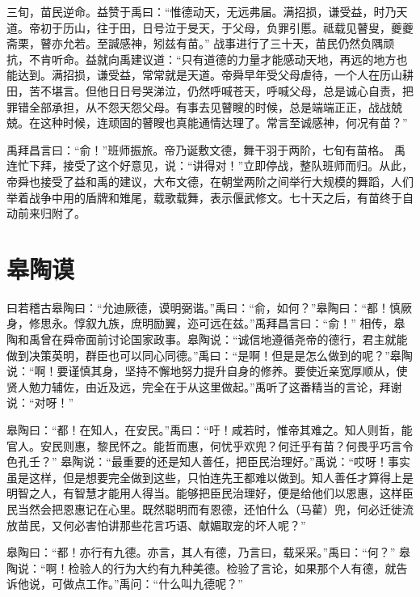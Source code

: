 \documentclass[a4paper,12pt,UTF8,twoside]{ctexbook}
\begin{document}
三旬，苗民逆命。益赞于禹曰：“惟德动天，无远弗届。满招损，谦受益，时乃天道。帝初于历山，往于田，日号泣于旻天，于父母，负罪引慝。祗载见瞽叟，夔夔斋栗，瞽亦允若。至諴感神，矧兹有苗。”
战事进行了三十天，苗民仍然负隅顽抗，不肯听命。益就向禹建议道：“只有道德的力量才能感动天地，再远的地方也能达到。满招损，谦受益，常常就是天道。帝舜早年受父母虐待，一个人在历山耕田，苦不堪言。但他日日号哭涕泣，仍然呼喊苍天，呼喊父母，总是诚心自责，把罪错全部承担，从不怨天怨父母。有事去见瞽瞍的时候，总是端端正正，战战兢兢。在这种时候，连顽固的瞽瞍也真能通情达理了。常言至诚感神，何况有苗？”

禹拜昌言曰：“俞！”班师振旅。帝乃诞敷文德，舞干羽于两阶，七旬有苗格。
禹连忙下拜，接受了这个好意见，说：“讲得对！”立即停战，整队班师而归。从此，帝舜也接受了益和禹的建议，大布文德，在朝堂两阶之间举行大规模的舞蹈，人们举着战争中用的盾牌和雉尾，载歌载舞，表示偃武修文。七十天之后，有苗终于自动前来归附了。

\chapter{皋陶谟}

曰若稽古皋陶曰：“允迪厥德，谟明弼谐。”禹曰：“俞，如何？”皋陶曰：“都！慎厥身，修思永。惇叙九族，庶明励翼，迩可远在兹。”禹拜昌言曰：“俞！”
相传，皋陶和禹曾在舜帝面前讨论国家政事。皋陶说：“诚信地遵循尧帝的德行，君主就能做到决策英明，群臣也可以同心同德。”禹曰：“是啊！但是是怎么做到的呢？”皋陶说：“啊！要谨慎其身，坚持不懈地努力提升自身的修养。要使近亲宽厚顺从，使贤人勉力辅佐，由近及远，完全在于从这里做起。”禹听了这番精当的言论，拜谢说：“对呀！”

皋陶曰：“都！在知人，在安民。”禹曰：“吁！咸若时，惟帝其难之。知人则哲，能官人。安民则惠，黎民怀之。能哲而惠，何忧乎欢兜？何迁乎有苗？何畏乎巧言令色孔壬？”
皋陶说：“最重要的还是知人善任，把臣民治理好。”禹说：“哎呀！事实虽是这样，但是想要完全做到这些，只怕连先王都难以做到。知人善任才算得上是明智之人，有智慧才能用人得当。能够把臣民治理好，便是给他们以恩惠，这样臣民当然会把恩惠记在心里。既然聪明而有恩德，还怕什么（马雚）兜，何必迁徙流放苗民，又何必害怕讲那些花言巧语、献媚取宠的坏人呢？”

皋陶曰：“都！亦行有九德。亦言，其人有德，乃言曰，载采采。”禹曰：“何？”
皋陶说：“啊！检验人的行为大约有九种美德。检验了言论，如果那个人有德，就告诉他说，可做点工作。”禹问：“什么叫九德呢？”
\end{document}

